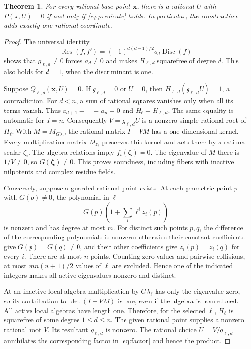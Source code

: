\documentclass[11pt,a4paper]{article}
\newtheorem{theorem}{Theorem}[section]
\DeclareMathOperator{\Res}{Res}
\begin{document}
\begin{theorem}\label{thm:elimination}
For every rational base point $\mathbf x$, there is a rational $U$
with $P(\mathbf x,U)=0$ if and only if \eqref{eq:predicate} holds.
In particular, the construction adds exactly one rational coordinate.
\end{theorem}
\begin{proof}
The universal identity
\[
 \Res(f,f')=(-1)^{d(d-1)/2}a_d\operatorname{Disc}(f)
\]
shows that $g_{\ell,d}\ne0$ forces $a_d\ne0$ and makes
$H_{\ell,d}$ squarefree of degree $d$. This also holds for
$d=1$, when the discriminant is one.

Suppose $Q_{\ell,d}(\mathbf x,U)=0$. If $g_{\ell,d}=0$ or
$U=0$, then $H_{\ell,d}(g_{\ell,d}U)=1$, a contradiction.
For $d<n$, a sum of rational squares vanishes only when all its
terms vanish. Thus $a_{d+1}=\cdots=a_n=0$ and
$H_\ell=H_{\ell,d}$. The same equality is automatic for $d=n$.
Consequently $V=g_{\ell,d}U$ is a nonzero simple rational root
of $H_\ell$. With $M=M_{G\lambda_\ell}$, the rational matrix
$I-VM$ has a one-dimensional kernel. Every multiplication matrix
$M_{z_i}$ preserves this kernel and acts there by a rational scalar
$\zeta_i$. The algebra relations imply $f_i(\boldsymbol\zeta)=0$.
The eigenvalue of $M$ there is $1/V\ne0$, so
$G(\boldsymbol\zeta)\ne0$. This proves soundness, including
fibers with inactive nilpotents and complex residue fields.

Conversely, suppose a guarded rational point exists. At each geometric
point $p$ with $G(p)\ne0$, the polynomial in $\ell$
\[
 G(p)\left(1+\sum_i\ell^iz_i(p)\right)
\]
is nonzero and has degree at most $m$. For distinct such points
$p,q$, the difference of the corresponding polynomials is nonzero:
otherwise their constant coefficients give $G(p)=G(q)\ne0$,
and their other coefficients give $z_i(p)=z_i(q)$ for every $i$.
There are at most $n$ points. Counting zero values and pairwise
collisions, at most $m n(n+1)/2$ values of $\ell$ are excluded.
Hence one of the indicated integers makes all active eigenvalues
nonzero and distinct.

At an inactive local algebra multiplication by $G\lambda_\ell$
has only the eigenvalue zero, so its contribution to
$\det(I-VM)$ is one, even if the algebra is nonreduced.
All active local algebras have length one. Therefore, for the selected
$\ell$, $H_\ell$ is squarefree of some degree $1\le d\le n$.
The given rational point supplies a nonzero rational root $V$.
Its resultant $g_{\ell,d}$ is nonzero. The rational choice
$U=V/g_{\ell,d}$ annihilates the corresponding factor
in \eqref{eq:factor} and hence the product.
\end{proof}
\end{document}
